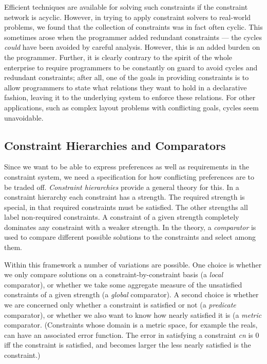 \documentclass{article}
\newcommand{\strength}{\rm}
\begin{document}
Efficient techniques are available for solving such constraints if the
constraint network is acyclic.  However, in trying to apply constraint
solvers to real-world problems, we found that the collection of constraints
was in fact often cyclic.  This sometimes arose when the programmer
added redundant constraints --- the cycles {\em could} have been avoided by
careful analysis.  However, this is an added burden on the programmer.
Further, it is clearly contrary to the spirit of the whole enterprise to
require programmers to be constantly on guard to avoid cycles and redundant
constraints; after all, one of the goals in providing constraints is to
allow programmers to state what relations they want to hold in a
declarative fashion, leaving it to the underlying system to enforce these
relations.  For other applications, such as complex layout problems with
conflicting goals,  cycles seem unavoidable.

\subsection{Constraint Hierarchies and Comparators}

Since we want to be able to express preferences as well as requirements in
the constraint system, we need a specification for how conflicting
preferences are to be traded off.  {\em Constraint hierarchies}
\cite{borning-lisp-symbolic-computation-92} provide a general theory for
this.  In a constraint hierarchy each constraint has a strength.  The
{\strength required} strength is special, in that {\strength required}
constraints must be satisfied.  The other strengths all label non-required
constraints.  A constraint of a given strength completely dominates any
constraint with a weaker strength.  In the theory, a {\em comparator} is
used to compare different possible solutions to the constraints and select
among them.

Within this framework a number of variations are possible.  One choice is
whether we only compare solutions on a constraint-by-constraint basis (a
{\em local} comparator), or whether we take some aggregate measure of the
unsatisfied constraints of a given strength (a {\em global} comparator).  A
second choice is whether we are concerned only whether a constraint is
satisfied or not (a {\em predicate} comparator), or whether we also want to
know how nearly satisfied it is (a {\em metric} comparator.  (Constraints
whose domain is a metric space, for example the reals, can have an
associated error function.  The error in satisfying a constraint {\em cn}
is 0 iff the constraint is satisfied, and becomes larger the less nearly
satisfied is the constraint.)
\end{document}
